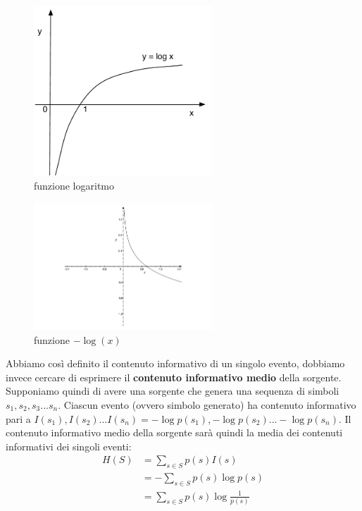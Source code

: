 \begin{figure}[htbp]
\begin{center}
	\includegraphics[width=0.6\textwidth]{img/logx.pdf}
\caption{funzione logaritmo}
\label{fig:0010}
\end{center}
\end{figure}

\begin{figure}[htbp]
\begin{center}
	\includegraphics[width=0.6\textwidth]{img/logx2.pdf}
\caption{funzione \(- \log(x)\)}
\label{fig:0011}
\end{center}
\end{figure}

Abbiamo così definito il contenuto informativo di un singolo evento, dobbiamo invece cercare di esprimere il \textbf{contenuto informativo medio} della sorgente. Supponiamo quindi di avere una sorgente che genera una sequenza di simboli \(s_1, s_2, s_3 ... s_n\). Ciascun evento (ovvero simbolo generato) ha contenuto informativo pari a \(I(s_1), I(s_2) ... I(s_n) = -\log p(s_1), -\log p(s_2) ... -\log p(s_n)\). Il contenuto informativo medio della sorgente sarà quindi la media dei contenuti informativi dei singoli eventi:
\[
\begin{split}
H(S) &= \sum_{s \in S} p(s) I(s)\\
&= - \sum_{s \in S} p(s) \log p(s)\\
&= \sum_{s \in S} p(s) \log \frac{1}{p(s)}
\end{split}
\]

